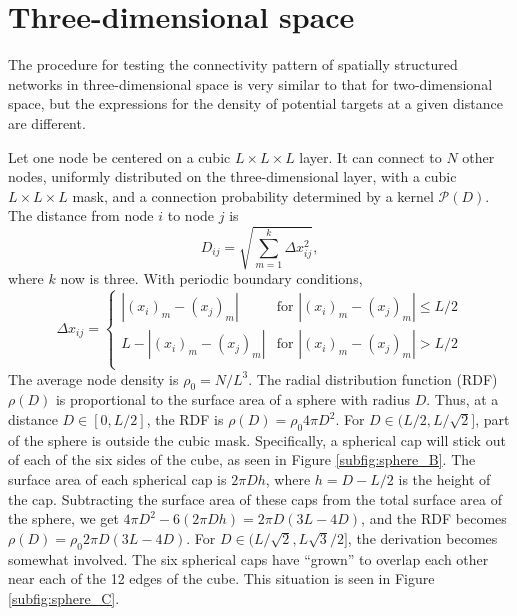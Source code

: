 \graphicspath{{figs/spatial/}}










\section{Three-dimensional space\label{sec:3D}}

The procedure for testing the connectivity pattern of spatially structured networks in three-dimensional space is very similar to that for two-dimensional space, but the expressions for the density of potential targets at a given distance are different.

Let one node be centered on a cubic $L \times L \times L$ layer. It can connect to $N$ other nodes, uniformly distributed on the three-dimensional layer, with a cubic $L \times L \times L$ mask, and a connection probability determined by a kernel $\mathcal{P}(D)$. The distance from node $i$ to node $j$ is 
\begin{equation}
D_{ij} = \sqrt{\sum_{m=1}^k \Delta x_{ij}^2},
\end{equation}
where $k$ now is three. With periodic boundary conditions, 
\begin{equation}
\Delta x_{ij} = 
\begin{cases}
|(x_i)_m - (x_j)_m| & \text{for } |(x_i)_m - (x_j)_m| \le L/2 \\
L - |(x_i)_m - (x_j)_m| & \text{for } |(x_i)_m - (x_j)_m| > L/2 \\
\end{cases}
\end{equation}
The average node density is $\rho_0 = N / L^3$. The radial distribution function (RDF) $\rho(D)$ is proportional to the surface area of a sphere with radius $D$. Thus, at a distance $D \in [0, L/2]$, the RDF is $\rho(D) = \rho_0 4 \pi D^2$. For $D \in (L/2, L/\sqrt{2}]$, part of the sphere is outside the cubic mask. Specifically, a spherical cap will stick out of each of the six sides of the cube, as seen in Figure \ref{subfig:sphere_B}. The surface area of each spherical cap is $2\pi Dh$, where $h = D - L/2$ is the height of the cap. Subtracting the surface area of these caps from the total surface area of the sphere, we get $4\pi D^2 - 6 \left(2 \pi Dh \right) = 2\pi D \left(3L - 4D\right)$, and the RDF becomes $\rho(D) = \rho_0 2\pi D \left(3L - 4D\right)$. For $D \in (L/\sqrt{2}, L\sqrt{3}/2]$, the derivation becomes somewhat involved. The six spherical caps have ``grown'' to overlap each other near each of the 12 edges of the cube. This situation is seen in Figure \ref{subfig:sphere_C}.
